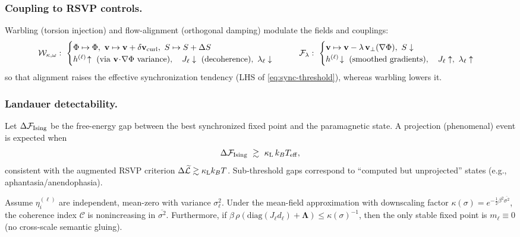 \documentclass[a4paper,11pt]{article}
\begin{document}
\subsubsection{Coupling to RSVP controls.}
Warbling (torsion injection) and flow-alignment (orthogonal damping) modulate
the fields and couplings:
\begin{equation}
\mathcal{W}_{\kappa,\omega}:\ 
\begin{cases}
\Phi\mapsto\Phi,\ \mathbf v\mapsto \mathbf v+\delta\mathbf v_{\rm curl},\ S\mapsto S+\Delta S\\
h^{(\ell)}\!\uparrow\ \text{(via }\mathbf v\!\cdot\!\nabla\Phi\text{ variance)},\quad
J_\ell\downarrow\ (\text{decoherence}),\ \lambda_\ell\downarrow
\end{cases}
\qquad
\mathcal{F}_\lambda:\ 
\begin{cases}
\mathbf v\mapsto \mathbf v-\lambda\,\mathbf v_\perp(\nabla\Phi),\ S\downarrow\\
h^{(\ell)}\!\downarrow\ \text{(smoothed gradients)},\quad
J_\ell\uparrow,\ \lambda_\ell\uparrow
\end{cases}
\end{equation}
so that alignment raises the effective synchronization tendency (LHS of
\eqref{eq:sync-threshold}), whereas warbling lowers it.

\subsubsection{Landauer detectability.}
Let $\Delta \mathcal{F}_{\rm Ising}$ be the free-energy gap between the best
synchronized fixed point and the paramagnetic state. A projection (phenomenal)
event is expected when
\begin{equation}
\label{eq:landauer-ising}
\Delta \mathcal{F}_{\rm Ising} \ \gtrsim\ \kappa_{\rm L}\,k_B T_{\rm eff},
\end{equation}
consistent with the augmented RSVP criterion
$\Delta \widetilde{\mathcal{L}}\gtrsim \kappa_{\rm L} k_B T$.
Sub-threshold gaps correspond to ``computed but unprojected'' states (e.g.,
aphantasia/anendophasia).

\begin{proposition}
\label{prop:hazard-coherence}
Assume $\eta_i^{(\ell)}$ are independent, mean-zero with variance $\sigma_\ell^2$.
Under the mean-field approximation with downscaling factor
$\kappa(\sigma)=e^{-\frac{1}{2}\beta^2 \overline{\sigma^2}}$, the coherence
index $\mathcal{C}$ is nonincreasing in $\overline{\sigma^2}$. Furthermore, if
\(
\beta\,\rho(\mathrm{diag}(J_\ell d_\ell)+\mathbf{\Lambda})\le
\kappa(\sigma)^{-1}
\),
then the only stable fixed point is $m_\ell\equiv 0$ (no cross-scale semantic
gluing).
\end{proposition}
\end{document}
